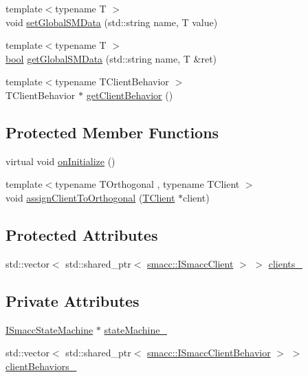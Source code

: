 \begin{DoxyCompactItemize}
\item 
{\footnotesize template$<$typename T $>$ }\\void \hyperlink{classsmacc_1_1ISmaccOrthogonal_a2b5b15907fa6c7c6882717246f0633ab}{set\+Global\+S\+M\+Data} (std\+::string name, T value)
\item 
{\footnotesize template$<$typename T $>$ }\\\hyperlink{classbool}{bool} \hyperlink{classsmacc_1_1ISmaccOrthogonal_aa763280bc6980811744c8e8f11b2dcd0}{get\+Global\+S\+M\+Data} (std\+::string name, T \&ret)
\item 
{\footnotesize template$<$typename T\+Client\+Behavior $>$ }\\T\+Client\+Behavior $\ast$ \hyperlink{classsmacc_1_1ISmaccOrthogonal_a463bb235217511954feb4133394c4c61}{get\+Client\+Behavior} ()
\end{DoxyCompactItemize}
\subsection*{Protected Member Functions}
\begin{DoxyCompactItemize}
\item 
virtual void \hyperlink{classsmacc_1_1ISmaccOrthogonal_a6bb31c620cb64dd7b8417f8705c79c7a}{on\+Initialize} ()
\item 
{\footnotesize template$<$typename T\+Orthogonal , typename T\+Client $>$ }\\void \hyperlink{classsmacc_1_1ISmaccOrthogonal_a2241e4d2018f5bd74bd1925f19791606}{assign\+Client\+To\+Orthogonal} (\hyperlink{classTClient}{T\+Client} $\ast$client)
\end{DoxyCompactItemize}
\subsection*{Protected Attributes}
\begin{DoxyCompactItemize}
\item 
std\+::vector$<$ std\+::shared\+\_\+ptr$<$ \hyperlink{classsmacc_1_1ISmaccClient}{smacc\+::\+I\+Smacc\+Client} $>$ $>$ \hyperlink{classsmacc_1_1ISmaccOrthogonal_a0f270e9c8c126198f6bce542ab4e04ba}{clients\+\_\+}
\end{DoxyCompactItemize}
\subsection*{Private Attributes}
\begin{DoxyCompactItemize}
\item 
\hyperlink{classsmacc_1_1ISmaccStateMachine}{I\+Smacc\+State\+Machine} $\ast$ \hyperlink{classsmacc_1_1ISmaccOrthogonal_a418b2e094a65013444ec1fca7e94f28d}{state\+Machine\+\_\+}
\item 
std\+::vector$<$ std\+::shared\+\_\+ptr$<$ \hyperlink{classsmacc_1_1ISmaccClientBehavior}{smacc\+::\+I\+Smacc\+Client\+Behavior} $>$ $>$ \hyperlink{classsmacc_1_1ISmaccOrthogonal_a02df51ab34a478841c54cbbba1b161c3}{client\+Behaviors\+\_\+}
\end{DoxyCompactItemize}
